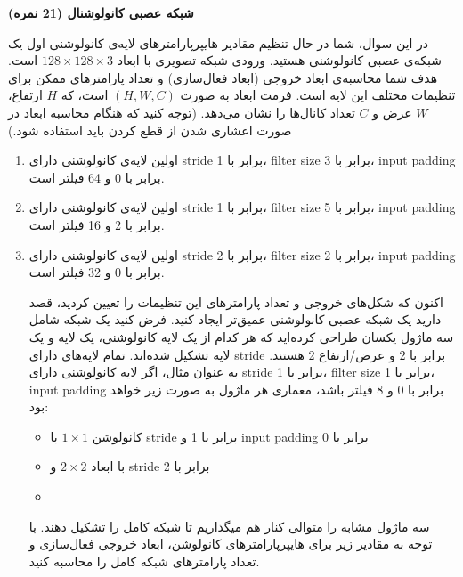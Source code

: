 \textbf{شبکه عصبی کانولوشنال (21 نمره)}

در این سوال، شما در حال تنظیم مقادیر هایپرپارامترهای لایه‌ی کانولوشنی اول یک شبکه‌ی عصبی کانولوشنی هستید. ورودی شبکه تصویری با ابعاد $128 \times 128 \times 3$ است. هدف شما محاسبه‌ی ابعاد خروجی (ابعاد فعال‌سازی) و تعداد پارامترهای ممکن برای تنظیمات مختلف این لایه است. فرمت ابعاد به صورت \((H, W, C)\) است، که \(H\) ارتفاع، \(W\) عرض و \(C\) تعداد کانال‌ها را نشان می‌دهد.
(توجه کنید که هنگام محاسبه ابعاد در صورت اعشاری شدن از قطع کردن باید استفاده شود.)

\begin{enumerate}
    \item اولین لایه‌ی کانولوشنی دارای stride برابر با 1، filter size برابر با 3، input padding برابر با 0 و 64 فیلتر است.


    \vspace{3cm}

    



    \item اولین لایه‌ی کانولوشنی دارای stride برابر با 1، filter size برابر با 5، input padding برابر با 2 و 16 فیلتر است.
\vspace{3cm}


    \item اولین لایه‌ی کانولوشنی دارای stride برابر با 2، filter size برابر با 2، input padding برابر با 0 و 32 فیلتر است.
\vspace{4cm}


    اکنون که شکل‌های خروجی و تعداد پارامترهای این تنظیمات را تعیین کردید، قصد دارید یک شبکه عصبی کانولوشنی عمیق‌تر ایجاد کنید. فرض کنید یک شبکه شامل سه ماژول یکسان طراحی کرده‌اید که هر کدام از یک لایه کانولوشنی، یک لایه  و یک لایه  تشکیل شده‌اند. تمام لایه‌های  دارای stride برابر با 2 و عرض/ارتفاع 2 هستند. به عنوان مثال، اگر لایه کانولوشنی دارای stride برابر با 1، filter size برابر با 1، input padding برابر با 0 و 8 فیلتر باشد، معماری هر ماژول به صورت زیر خواهد بود:
    \begin{itemize}
        \item کانولوشن $1 \times 1$ با stride برابر با 1 و input padding برابر با 0
        \item {} با ابعاد $2 \times 2$ و stride برابر با 2
        \item {}
    \end{itemize}
    \pagebreak


    سه ماژول مشابه را متوالی کنار هم میگذاریم تا شبکه کامل را تشکیل دهند. با توجه به مقادیر زیر برای هایپرپارامترهای کانولوشن، ابعاد خروجی فعال‌سازی و تعداد پارامترهای شبکه کامل را محاسبه کنید.


\end{enumerate}
